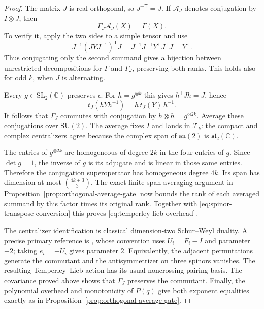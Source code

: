 \begin{proof}
The matrix $J$ is real orthogonal, so $J^{-\mathsf T}=J$.
If $\mathcal A_J$ denotes conjugation by $I\otimes J$, then
\begin{equation}\label{eq:spinor-transpose-conversion}
 \Gamma_J\mathcal A_J(X)=\Gamma(X).
\end{equation}
To verify it, apply the two sides to a simple tensor and use
\[
 J^{-1}(JYJ^{-1})^{\mathsf T}J
  =J^{-1}J^{-\mathsf T}Y^{\mathsf T}J^{\mathsf T}J
  =Y^{\mathsf T}.
\]
Thus conjugating only the second summand gives a bijection between
unrestricted decompositions for $\Gamma$ and $\Gamma_J$, preserving
both ranks. This holds also for odd $k$, when $J$ is alternating.

Every $g\in\mathrm{SL}_2(\mathbb C)$ preserves $\epsilon$.
For $h=g^{\otimes k}$ this gives $h^{\mathsf T}Jh=J$, hence
\[
 t_J(hYh^{-1})=h\,t_J(Y)\,h^{-1}.
\]
It follows that $\Gamma_J$ commutes with conjugation by
$h\otimes h=g^{\otimes2k}$. Average these conjugations over
$\mathrm{SU}(2)$. The average fixes $I$ and lands in $\mathcal T_k$:
the compact and complex centralizers agree because the complex
span of $\mathfrak{su}(2)$ is $\mathfrak{sl}_2(\mathbb C)$.

The entries of $g^{\otimes2k}$ are homogeneous of degree $2k$
in the four entries of $g$. Since $\det g=1$, the inverse of $g$
is its adjugate and is linear in those same entries. Therefore
the conjugation superoperator has homogeneous degree $4k$.
Its span has dimension at most $\binom{4k+3}{3}$. The exact
finite-span averaging argument in
Proposition~\ref{prop:orthogonal-average-gate} now bounds the
rank of each averaged summand by this factor times its original
rank. Together with \eqref{eq:spinor-transpose-conversion} this
proves \eqref{eq:temperley-lieb-overhead}.

The centralizer identification is classical dimension-two
Schur--Weyl duality. A precise primary reference is
\cite[Section~6.1, Theorem~6.4, pp.~28--29]{CruzErdmann2026}, whose convention
uses $U_i=F_i-I$ and parameter $-2$; taking $e_i=-U_i$ gives
parameter $2$. Equivalently, the adjacent permutations generate
the commutant and the antisymmetrizer on three spinors vanishes.
The resulting Temperley--Lieb action has its usual noncrossing
pairing basis. The covariance proved above shows that $\Gamma_J$
preserves the commutant. Finally, the polynomial overhead and
monotonicity of $P(q)$ give both exponent equalities exactly as in
Proposition~\ref{prop:orthogonal-average-gate}.
\end{proof}

